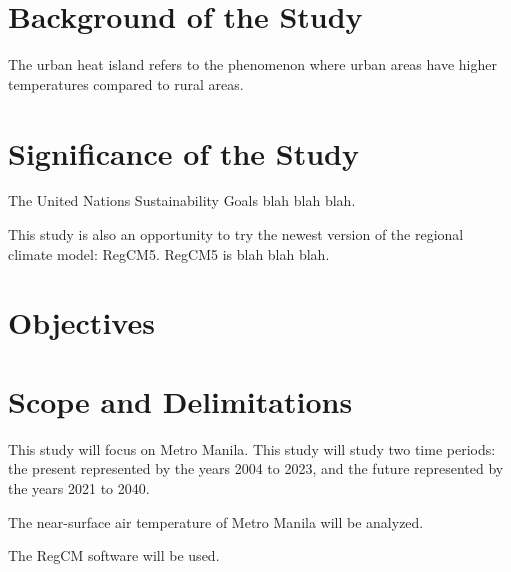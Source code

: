 \section{Background of the Study}
	The urban heat island refers to the phenomenon where urban areas have higher temperatures compared to rural areas.
	
\section{Significance of the Study}
	The United Nations Sustainability Goals blah blah blah.
	
	This study is also an opportunity to try the newest version of the regional climate model: RegCM5. RegCM5 is blah blah blah.

\section{Objectives}

\section{Scope and Delimitations}
	This study will focus on Metro Manila.
	This study will study two time periods: 
		the present represented by the years 2004 to 2023, 
		and the future represented by the years 2021 to 2040.
	
	The near-surface air temperature of Metro Manila will be analyzed.
	
	The RegCM software will be used.